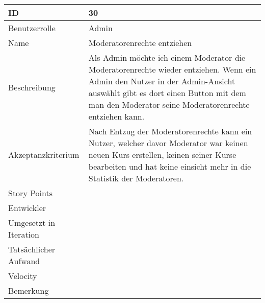 \begin{tabularx}{\textwidth}{|p{}|X|}
	\hline
	ID & 30 \\
	\hline
	Benutzerrolle & Admin \\
	\hline
	Name & Moderatorenrechte entziehen\\
	\hline
	Beschreibung & Als Admin möchte ich einem Moderator die Moderatorenrechte wieder entziehen. Wenn ein Admin den Nutzer in der Admin-Ansicht auswählt gibt es dort einen Button mit dem man den Moderator seine Moderatorenrechte entziehen kann.  \\
	\hline
	Akzeptanzkriterium & Nach Entzug der Moderatorenrechte kann ein Nutzer, welcher davor Moderator war keinen neuen Kurs erstellen, keinen seiner Kurse bearbeiten und hat keine einsicht mehr in die Statistik der Moderatoren. \\
	\hline
	Story Points &  \\
	\hline
	Entwickler &  \\
	\hline
	Umgesetzt in Iteration & \\
	\hline
	Tatsächlicher Aufwand & \\
	\hline
	Velocity & \\
	\hline
	Bemerkung & \\
	\hline
\end{tabularx}
\vspace{20pt}
